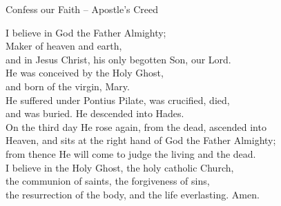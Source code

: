 Confess our Faith -- Apostle's Creed \\
	\vspace{.4em}
\begin{leftbar}
I believe in God the Father Almighty;\\
Maker of heaven and earth, \\
and in Jesus Christ, his only begotten Son, our Lord.\\
He was conceived by the Holy Ghost, \\
and born of the virgin, Mary. \\
He suffered under Pontius Pilate, was crucified, died, \\
and was buried. He descended into Hades.\\
On the third day He rose again, from the dead, ascended into\\
Heaven, and sits at the right hand of God the Father Almighty;\\ 
from thence He will come to judge the living and the dead.\\
I believe in the Holy Ghost, the holy catholic Church, \\
the communion of saints, the forgiveness of sins,\\
the resurrection of the body, and the life everlasting. Amen.
\end{leftbar}

\vspace{-1em}

